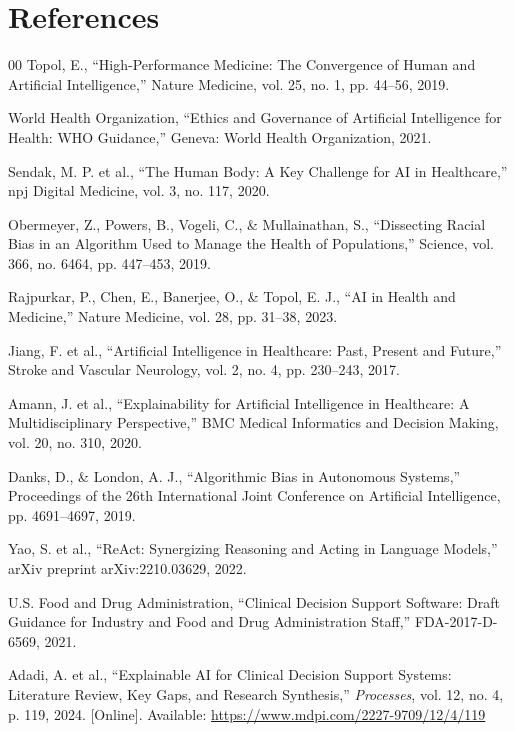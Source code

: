 \documentclass[conference]{IEEEtran}
\begin{document}
\section*{References}
\begin{thebibliography}{00}
 Topol, E., ``High-Performance Medicine: The Convergence of Human and Artificial Intelligence,'' Nature Medicine, vol. 25, no. 1, pp. 44--56, 2019.

 World Health Organization, ``Ethics and Governance of Artificial Intelligence for Health: WHO Guidance,'' Geneva: World Health Organization, 2021.

 Sendak, M. P. et al., ``The Human Body: A Key Challenge for AI in Healthcare,'' npj Digital Medicine, vol. 3, no. 117, 2020.

 Obermeyer, Z., Powers, B., Vogeli, C., \& Mullainathan, S., ``Dissecting Racial Bias in an Algorithm Used to Manage the Health of Populations,'' Science, vol. 366, no. 6464, pp. 447--453, 2019.

 Rajpurkar, P., Chen, E., Banerjee, O., \& Topol, E. J., ``AI in Health and Medicine,'' Nature Medicine, vol. 28, pp. 31--38, 2023.

 Jiang, F. et al., ``Artificial Intelligence in Healthcare: Past, Present and Future,'' Stroke and Vascular Neurology, vol. 2, no. 4, pp. 230--243, 2017.

 Amann, J. et al., ``Explainability for Artificial Intelligence in Healthcare: A Multidisciplinary Perspective,'' BMC Medical Informatics and Decision Making, vol. 20, no. 310, 2020.

 Danks, D., \& London, A. J., ``Algorithmic Bias in Autonomous Systems,'' Proceedings of the 26th International Joint Conference on Artificial Intelligence, pp. 4691--4697, 2019.

 Yao, S. et al., ``ReAct: Synergizing Reasoning and Acting in Language Models,'' arXiv preprint arXiv:2210.03629, 2022.

 U.S. Food and Drug Administration, ``Clinical Decision Support Software: Draft Guidance for Industry and Food and Drug Administration Staff,'' FDA-2017-D-6569, 2021.

 Adadi, A. et al., ``Explainable AI for Clinical Decision Support Systems: Literature Review, Key Gaps, and Research Synthesis,'' \textit{Processes}, vol. 12, no. 4, p. 119, 2024. [Online]. Available: \url{https://www.mdpi.com/2227-9709/12/4/119}


\end{thebibliography}
\end{document}
